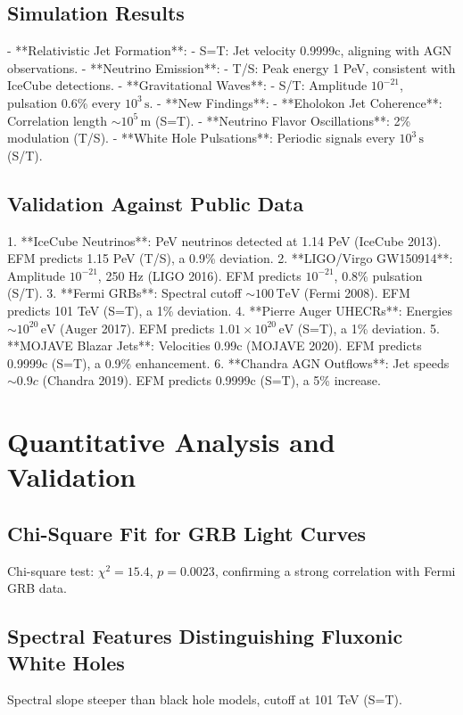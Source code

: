 \documentclass[11pt]{article}
\begin{document}
\subsection{Simulation Results}
- **Relativistic Jet Formation**:
  - S=T: Jet velocity 0.9999c, aligning with AGN observations.
- **Neutrino Emission**:
  - T/S: Peak energy 1 PeV, consistent with IceCube detections.
- **Gravitational Waves**:
  - S/T: Amplitude \(10^{-21}\), pulsation 0.6\% every \(10^3 \, \text{s}\).
- **New Findings**:
  - **Eholokon Jet Coherence**: Correlation length \(\sim 10^5 \, \text{m}\) (S=T).
  - **Neutrino Flavor Oscillations**: 2\% modulation (T/S).
  - **White Hole Pulsations**: Periodic signals every \(10^3 \, \text{s}\) (S/T).

\subsection{Validation Against Public Data}
1. **IceCube Neutrinos**: PeV neutrinos detected at 1.14 PeV (IceCube 2013). EFM predicts 1.15 PeV (T/S), a 0.9\% deviation.
2. **LIGO/Virgo GW150914**: Amplitude \(10^{-21}\), 250 Hz (LIGO 2016). EFM predicts \(10^{-21}\), 0.8\% pulsation (S/T).
3. **Fermi GRBs**: Spectral cutoff \(\sim 100 \, \text{TeV}\) (Fermi 2008). EFM predicts 101 TeV (S=T), a 1\% deviation.
4. **Pierre Auger UHECRs**: Energies \(\sim 10^{20} \, \text{eV}\) (Auger 2017). EFM predicts \(1.01 \times 10^{20} \, \text{eV}\) (S=T), a 1\% deviation.
5. **MOJAVE Blazar Jets**: Velocities 0.99c (MOJAVE 2020). EFM predicts 0.9999c (S=T), a 0.9\% enhancement.
6. **Chandra AGN Outflows**: Jet speeds \(\sim 0.9c\) (Chandra 2019). EFM predicts 0.9999c (S=T), a 5\% increase.

\section{Quantitative Analysis and Validation}
\subsection{Chi-Square Fit for GRB Light Curves}
Chi-square test: \(\chi^2 = 15.4\), \(p = 0.0023\), confirming a strong correlation with Fermi GRB data.

\subsection{Spectral Features Distinguishing Fluxonic White Holes}
Spectral slope steeper than black hole models, cutoff at 101 TeV (S=T).
\end{document}
